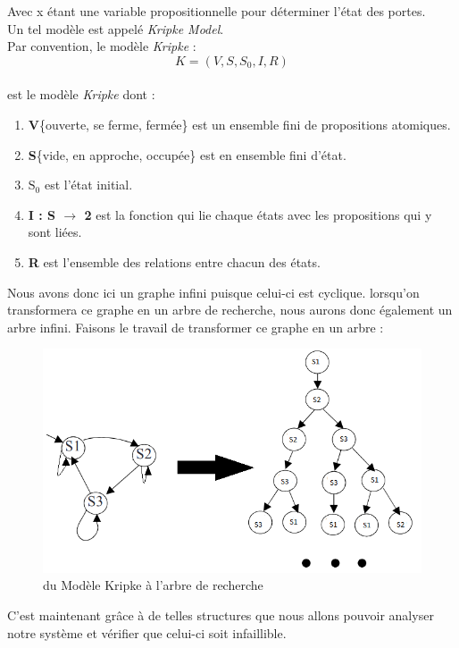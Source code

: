 \documentclass[runningheads,a4paper]{llncs}
\begin{document}
\noindent Avec x étant une variable propositionnelle pour déterminer l'état des portes.\\
Un tel modèle est appelé \textit{Kripke Model}.\\
Par convention, le modèle \textit{Kripke} : $$K = (V, S, S_{0}, I, R)$$ \\
est le modèle \textit{Kripke} dont :
\begin{enumerate}
\item \textbf{V}\{ouverte, se ferme, fermée\} est un ensemble fini de propositions atomiques.
\item \textbf{S}\{vide, en approche, occupée\} est en ensemble fini d'état.
\item \textbf{$\textrm{S}_\textrm{0}$} est l'état initial.
\item \textbf{I : S $\rightarrow$ 2} est la fonction qui lie chaque états avec les propositions qui y sont liées.
\item \textbf{R} est l'ensemble des relations entre chacun des états.
\end{enumerate}

\noindent Nous avons donc ici un graphe infini puisque celui-ci est cyclique. lorsqu'on transformera ce graphe en un arbre de recherche, nous aurons donc également un arbre infini. Faisons le travail de transformer ce graphe en un arbre : 
\begin{figure}[!h]
	\includegraphics[scale=0.4]{kripke.png}
	\centering
	\caption{du Modèle Kripke à l'arbre de recherche}
	\label{label-image4}
\end{figure}

\noindent C'est maintenant grâce à de telles structures que nous allons pouvoir analyser notre système et vérifier que celui-ci soit infaillible.
\end{document}
